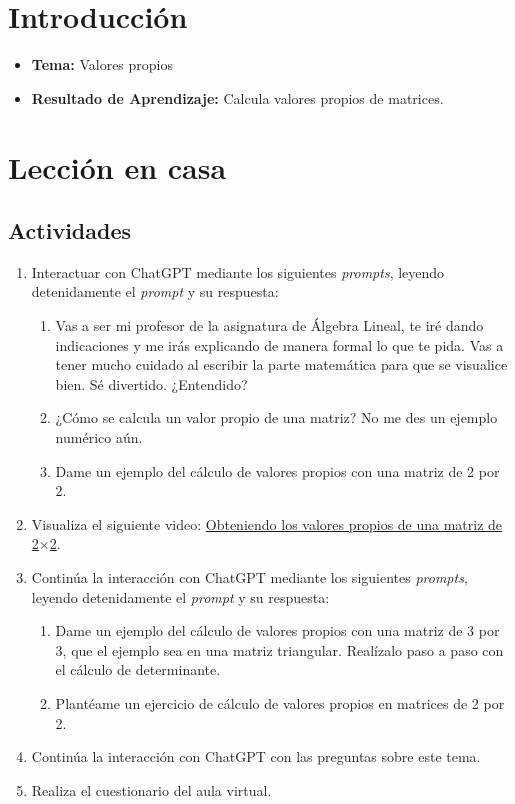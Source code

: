 \documentclass[a4,11pt]{aleph-notas}
\begin{document}
\encabezado

\vspace*{-10mm}
\section*{Introducción}

\begin{itemize}
    \item \textbf{Tema:} Valores propios
    \item \textbf{Resultado de Aprendizaje:} Calcula valores propios de matrices.
\end{itemize}

\section*{Lección en casa}

\subsection*{Actividades}

\begin{enumerate}[leftmargin=*]
    \item Interactuar con ChatGPT mediante los siguientes \textit{prompts}, leyendo detenidamente el \textit{prompt} y su respuesta:
    \begin{enumerate}[label=\textit{Prompt \arabic*.},leftmargin=2.1cm]
        \item Vas a ser mi profesor de la asignatura de Álgebra Lineal, te iré dando indicaciones y me irás explicando de manera formal lo que te pida. Vas a tener mucho cuidado al escribir la parte matemática para que se visualice bien. Sé divertido. ¿Entendido?
        \item ¿Cómo se calcula un valor propio de una matriz? No me des un ejemplo numérico aún.
        \item Dame un ejemplo del cálculo de valores propios con una matriz de 2 por 2.
    \end{enumerate}
    \item Visualiza el siguiente video: \href{https://youtu.be/HET8XcIX-n4?si=t4lUbTmWaPOTbtAM}{Obteniendo los valores propios de una matriz de 2$\times$2}.
    \item Continúa la interacción con ChatGPT mediante los siguientes \textit{prompts}, leyendo detenidamente el \textit{prompt} y su respuesta:
    \begin{enumerate}[label=\textit{Prompt \arabic*.},leftmargin=2.1cm,start=4]
        \item Dame un ejemplo del cálculo de valores propios con una matriz de 3 por 3, que el ejemplo sea en una matriz triangular. Realízalo paso a paso con el cálculo de determinante.
        \item Plantéame un ejercicio de cálculo de valores propios en matrices de 2 por 2.
    \end{enumerate}
    \item Continúa la interacción con ChatGPT con las preguntas sobre este tema.
    \item Realiza el cuestionario del aula virtual.
\end{enumerate}
\end{document}
